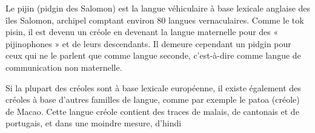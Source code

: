 
Le pijin (pidgin des Salomon) est la langue véhiculaire à base lexicale anglaise des îles Salomon, archipel comptant environ 80 langues vernaculaires. Comme le tok pisin, il est devenu un créole en devenant la langue maternelle pour des « pijinophones » et de leurs descendants. Il demeure cependant un pidgin pour ceux qui ne le parlent que comme langue seconde, c’est-à-dire comme langue de communication non maternelle.



Si la plupart des créoles sont à base lexicale européenne, il existe également des créoles à base d’autres familles de langue, comme par exemple le patoa (créole) de Macao. Cette langue créole contient des traces de malais, de cantonais et de portugais, et dans une moindre mesure, d’hindi


